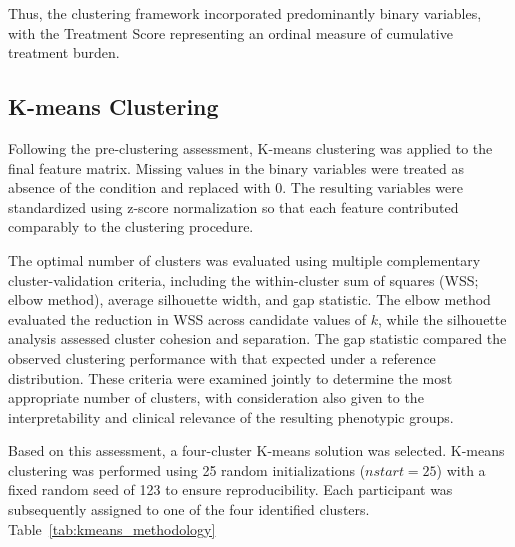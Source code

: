 \documentclass[11pt]{article}
\begin{document}
Thus, the clustering framework incorporated predominantly binary variables, with the Treatment Score representing an ordinal measure of cumulative treatment burden.



\subsection{K-means Clustering}

Following the pre-clustering assessment, K-means clustering was applied to the final feature matrix. Missing values in the binary variables were treated as absence of the condition and replaced with 0. The resulting variables were standardized using z-score normalization so that each feature contributed comparably to the clustering procedure.

The optimal number of clusters was evaluated using multiple complementary cluster-validation criteria, including the within-cluster sum of squares (WSS; elbow method), average silhouette width, and gap statistic. The elbow method evaluated the reduction in WSS across candidate values of $k$, while the silhouette analysis assessed cluster cohesion and separation. The gap statistic compared the observed clustering performance with that expected under a reference distribution. These criteria were examined jointly to determine the most appropriate number of clusters, with consideration also given to the interpretability and clinical relevance of the resulting phenotypic groups.

Based on this assessment, a four-cluster K-means solution was selected. K-means clustering was performed using 25 random initializations ($nstart = 25$) with a fixed random seed of 123 to ensure reproducibility. Each participant was subsequently assigned to one of the four identified clusters. Table~\ref{tab:kmeans_methodology}
\end{document}
